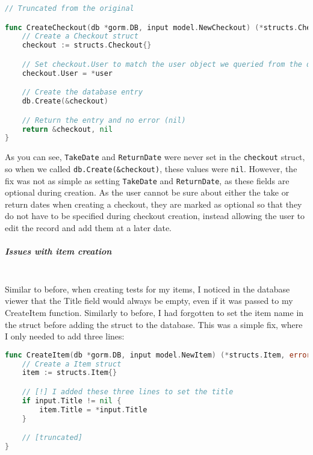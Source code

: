 \documentclass[../../main.tex]{subfiles}
\begin{document}
\begin{lstlisting}[language=Go]
// Truncated from the original

func CreateCheckout(db *gorm.DB, input model.NewCheckout) (*structs.Checkout, error) {
	// Create a Checkout struct
	checkout := structs.Checkout{}

    // Set checkout.User to match the user object we queried from the database
    checkout.User = *user

	// Create the database entry
	db.Create(&checkout)

    // Return the entry and no error (nil)
	return &checkout, nil
}
\end{lstlisting}

\noindent As you can see, \lstinline{TakeDate} and \lstinline{ReturnDate} were never set in the \lstinline{checkout} struct, so when we called \lstinline{db.Create(&checkout)}, these values were \lstinline{nil}.
However, the fix was not as simple as setting \lstinline{TakeDate} and \lstinline{ReturnDate}, as these fields are optional during creation. As the user cannot be sure about either the take or return dates when creating a checkout, they are marked as optional so that they do not have to be specified during checkout creation, instead allowing the user to edit the record and add them at a later date.

\subparagraph{Issues with item creation}

\noindent \\ Similar to before, when creating tests for my items, I noticed in the database viewer that the Title field would always be empty, even if it was passed to my CreateItem function.
Similarly to before, I had forgotten to set the item name in the struct before adding the struct to the database.
This was a simple fix, where I only needed to add three lines:

\begin{lstlisting}[language=Go]
func CreateItem(db *gorm.DB, input model.NewItem) (*structs.Item, error) {
	// Create a Item struct
	item := structs.Item{}

    // [!] I added these three lines to set the title
    if input.Title != nil {
		item.Title = *input.Title
	}

    // [truncated]
}
\end{lstlisting}

\begin{comment}
\noindent \\ commits:
\begin{outline}
    \1 User/create: email validation was broken, 72 char limit for passwords
    \2 https://github.com/jcxldn/fosscat/commit/605df88838143f717779ba289b58d567b5929a5a
    \1 Checkout/create: take and return dates not being stored in database
    \2 https://github.com/jcxldn/fosscat/commit/64d53884117ffc035b523457f9ee87433868e65c
    \1 Item/create: title not stored in DB
    \2 https://github.com/jcxldn/fosscat/commit/73aa435cc089d95f25d88ebdff6b77fc95cd3543
\end{outline}
\end{comment}
\end{document}
